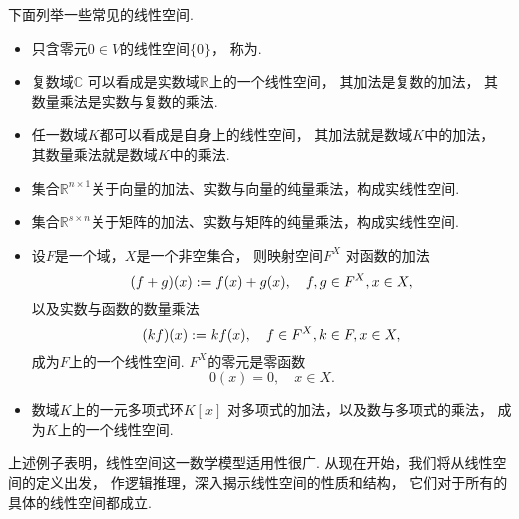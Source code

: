 \begin{example}
下面列举一些常见的线性空间.
\begin{itemize}
	\item 只含零元\(0 \in V\)的线性空间\(\{0\}\)，
	称为.

	\item 复数域\(\mathbb{C}\)
	可以看成是实数域\(\mathbb{R}\)上的一个线性空间，
	其加法是复数的加法，
	其数量乘法是实数与复数的乘法.

	\item 任一数域\(K\)都可以看成是自身上的线性空间，
	其加法就是数域\(K\)中的加法，
	其数量乘法就是数域\(K\)中的乘法.

	\item 集合\(\mathbb{R}^{n \times 1}\)关于向量的加法、实数与向量的纯量乘法，构成实线性空间.

	\item 集合\(\mathbb{R}^{s \times n}\)关于矩阵的加法、实数与矩阵的纯量乘法，构成实线性空间.

	\item 设\(F\)是一个域，\(X\)是一个非空集合，
	则映射空间\(F^X\)
	对函数的加法\[
		(f+g)(x) := f(x) + g(x),
		\quad f,g \in F^X, x \in X,
	\]
	以及实数与函数的数量乘法\[
		(k f)(x) := k f(x),
		\quad f \in F^X, k \in F, x \in X,
	\]
	成为\(F\)上的一个线性空间.
	\(F^X\)的零元是零函数\[
		0(x) = 0,
		\quad x \in X.
	\]

	\item 数域\(K\)上的一元多项式环\(K[x]\)
	对多项式的加法，以及数与多项式的乘法，
	成为\(K\)上的一个线性空间.
\end{itemize}
\end{example}

上述例子表明，线性空间这一数学模型适用性很广.
从现在开始，我们将从线性空间的定义出发，
作逻辑推理，深入揭示线性空间的性质和结构，
它们对于所有的具体的线性空间都成立.

